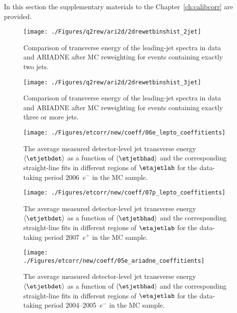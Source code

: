 In this section the supplementary materials to the Chapter~\ref{ch:calibcorr} are provided.

\begin{figure}[p]%
\texttt{[image: ./Figures/q2rew/ari2d/2drewetbinshist\_2jet]}%
\caption{Comparison of transverse energy of the leading-jet spectra in data
and ARIADNE after MC reweighting for events containing exactly two jets.}%
\label{fig:2dq2rew_et_2jet}%
\end{figure}

\begin{figure}[p]%
\texttt{[image: ./Figures/q2rew/ari2d/2drewetbinshist\_3jet]}%
\caption{Comparison of transverse energy of the leading-jet spectra in data
and ARIADNE after MC reweighting for events containing exactly three or more jets.}%
\label{fig:2dq2rew_et_3jet}%
\end{figure}

\begin{figure}[p]
\centering
\texttt{[image: ./Figures/etcorr/new/coeff/06e\_lepto\_coeffitients]}
\caption{The average measured detector-level jet transverse energy $\left\langle\etjetbdet\right\rangle$ as a function of $\left\langle\etjetbhad\right\rangle$ and the corresponding straight-line fits in different regions of $\etajetlab$ for the data-taking period 2006~$e^-$ in the \lepto MC sample.}
\label{fig:06e_lepto_coeffitients}
\end{figure}

\begin{figure}[p]
\centering
\texttt{[image: ./Figures/etcorr/new/coeff/07p\_lepto\_coeffitients]}
\caption{The average measured detector-level jet transverse energy $\left\langle\etjetbdet\right\rangle$ as a function of $\left\langle\etjetbhad\right\rangle$ and the corresponding straight-line fits in different regions of $\etajetlab$ for the data-taking period 2007~$e^+$ in the \lepto MC sample.}
\label{fig:07p_lepto_coeffitients}
\end{figure}

\begin{figure}[p]
\centering
\texttt{[image: ./Figures/etcorr/new/coeff/05e\_ariadne\_coeffitients]}
\caption{The average measured detector-level jet transverse energy $\left\langle\etjetbdet\right\rangle$ as a function of $\left\langle\etjetbhad\right\rangle$ and the corresponding straight-line fits in different regions of $\etajetlab$ for the data-taking period 2004--2005~$e^-$ in the \ariadne MC sample.}
\label{fig:05e_ariadne_coeffitients}
\end{figure}

